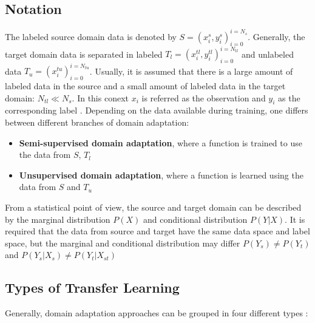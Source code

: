 \subsection{Notation}
The labeled source domain data is denoted by  $S = {(x_{i}^{s}, y_{i}^{s})_{i = 0}^{i = N_{s}}}$. Generally, the target domain data is separated in labeled $T_{l} = {(x_{i}^{tl}, y_{i}^{tl})_{i = 0}^{i = N_{tl}}}$ and unlabeled data $T_{u} = {(x_{i}^{tu})_{i = 0}^{i = N_{tu}}}$. Usually, it is assumed that there is a large amount of labeled data in the source and a small amount of labeled data in the target domain: $N_{tl} \ll N_{s}$. In this conext $x_{i}$ is referred as the observation and $y_{i}$ as the corresponding label  \cite{Patel2015}. Depending on the data available during training, one differs between different branches of domain adaptation: 
\begin{itemize}
\item \textbf{Semi-supervised domain adaptation}, where a function is trained to use the data from $S$, $T_{l}$
\item \textbf{Unsupervised domain adaptation}, where a function is learned using the data from $S$ and $T_{u}$ \cite{Patel2015} 
\end{itemize}

From a statistical point of view, the source and target domain can be described by the marginal distribution $P(X)$ and conditional distribution $P(Y|X)$. It is required that the data from source and target have the same data space and label space, but the marginal and conditional distribution may differ $P(Y_{s}) \neq P(Y_{t})$ and $P(Y_{s}|X_{s}) \neq P(Y_{t}|X_{st})$ \cite{Qikang2020}

\subsection{Types of Transfer Learning}
Generally, domain adaptation approaches can be grouped in four different types \cite{AZAMFAR2020103932}:  

